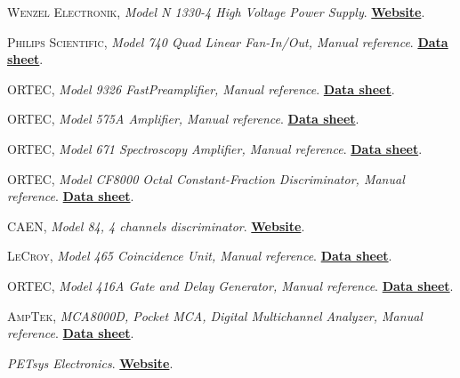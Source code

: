 \begin{thebibliography}{100}
 \textsc{Wenzel Electronik},
\textit{Model N 1330-4 High Voltage Power Supply}. \href{https://wenzel-elektronik.de}{\textbf{Website}}.

 \textsc{Philips Scientific},
\textit{Model 740 Quad Linear Fan-In/Out, Manual reference}. \href{https://prep.fnal.gov/catalog/hardware_info/phillips_scientific/740.html}{\textbf{Data sheet}}.

 \textsc{ORTEC},
\textit{Model 9326 FastPreamplifier, Manual reference}. \href{https://www.ortec-online.com/products/electronics/preamplifiers/9326}{\textbf{Data sheet}}.

 \textsc{ORTEC},
\textit{Model 575A Amplifier, Manual reference}. \href{https://www.ortec-online.com/products/electronics/amplifiers/575a}{\textbf{Data sheet}}.

 \textsc{ORTEC},
\textit{Model 671 Spectroscopy Amplifier, Manual reference}. \href{https://www.ortec-online.com/products/electronics/amplifiers/671}{\textbf{Data sheet}}.

 \textsc{ORTEC},
\textit{Model CF8000 Octal Constant-Fraction Discriminator, Manual reference}. \href{https://www.ortec-online.com/products/electronics/fast-timing-discriminators/cf8000}{\textbf{Data sheet}}.

 \textsc{CAEN},
\textit{Model 84, 4 channels discriminator}. \href{https://www.caen.it/}{\textbf{Website}}.

 \textsc{LeCroy},
\textit{Model 465 Coincidence Unit, Manual reference}. \href{https://prep.fnal.gov/catalog/hardware_info/lecroy/nim/465.html}{\textbf{Data sheet}}.

 \textsc{ORTEC},
\textit{Model 416A Gate and Delay Generator, Manual reference}. \href{https://www.ortec-online.com/products/electronics/delays-gates-and-logic-modules/416a}{\textbf{Data sheet}}.

 \textsc{AmpTek},
\textit{MCA8000D, Pocket MCA, Digital Multichannel Analyzer, Manual reference}. \href{https://www.amptek.com/products/multichannel-analyzers/mca-8000d-digital-multichannel-analyzer}{\textbf{Data sheet}}.

 \textit{PETsys Electronics}. \href{https://www.petsyselectronics.com/web/private/login}{\textbf{Website}}.


\end{thebibliography}
